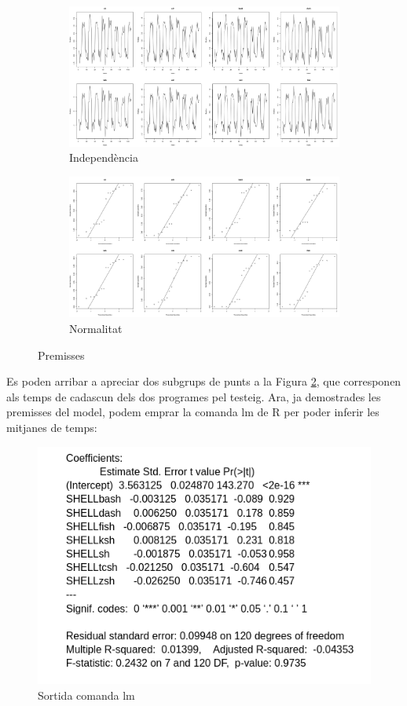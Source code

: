 \documentclass[12pt]{article}
\begin{document}
\begin{figure}[h!]
  \centering
  \begin{subfigure}[b]{0.75\linewidth}
      \includegraphics[width=\linewidth]{ind1.png}
      \caption{Independència}
      \label{fig:ind1}
  \end{subfigure}
  \begin{subfigure}[b]{0.75\linewidth}
    \includegraphics[width=\linewidth]{norm1.png}
    \caption{Normalitat}
    \label{fig:norm1}
  \end{subfigure}
  \caption{Premisses}
  \label{fig:prem1}
\end{figure}

Es poden arribar a apreciar dos subgrups de punts a la Figura \ref{fig:norm1}, que corresponen als temps de cadascun
dels dos programes pel testeig.
\newpage
Ara, ja demostrades les premisses del model, podem emprar la comanda lm de R per poder inferir les mitjanes de temps:
\begin{figure}[h!]
  \centering
  \includegraphics[width=15cm, height=8cm]{lm1.png}
  \caption{Sortida comanda lm}
  \label{fig:lm1}
\end{figure} 
\end{document}
